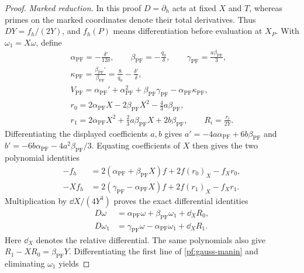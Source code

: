 \begin{proof}
\emph{Marked reduction.}
In this proof $D=\partial_h$ acts at fixed $X$ and $T$, whereas primes on
the marked coordinates denote their total derivatives.  Thus
$DY=f_h/(2Y)$, and $f_h(P)$ means differentiation before evaluation at
$X_P$.  With $\omega_1=X\omega$, define
\[
\begin{gathered}
\alpha_{\mathrm{PF}}=-\frac{\delta'}{12\delta},\qquad
\beta_{\mathrm{PF}}=-\frac{q_0}{\delta},\qquad
\gamma_{\mathrm{PF}}=\frac{a\beta_{\mathrm{PF}}}{3},\\
\kappa_{\mathrm{PF}}=\frac{\beta_{\mathrm{PF}}'}{\beta_{\mathrm{PF}}}
=\frac8{q_0}-\frac{\delta'}{\delta},\\
V_{\mathrm{PF}}=\alpha_{\mathrm{PF}}'+\alpha_{\mathrm{PF}}^2
+\beta_{\mathrm{PF}}\gamma_{\mathrm{PF}}
-\alpha_{\mathrm{PF}}\kappa_{\mathrm{PF}},\\
r_0=2\alpha_{\mathrm{PF}}X-2\beta_{\mathrm{PF}}X^2
-\tfrac43a\beta_{\mathrm{PF}},\\
r_1=2\alpha_{\mathrm{PF}}X^2+\tfrac23a\beta_{\mathrm{PF}}X
+2b\beta_{\mathrm{PF}},\qquad R_i=\frac{r_i}{2Y}.
\end{gathered}
\]
Differentiating the displayed coefficients $a,b$ gives
$a'=-4a\alpha_{\mathrm{PF}}+6b\beta_{\mathrm{PF}}$ and
$b'=-6b\alpha_{\mathrm{PF}}-4a^2\beta_{\mathrm{PF}}/3$.
Equating coefficients of $X$ then gives the two polynomial identities
\begin{equation}\label{pf:reduction-polynomials}
\begin{aligned}
-f_h&=2(\alpha_{\mathrm{PF}}+\beta_{\mathrm{PF}}X)f
       +2f(r_0)_X-f_Xr_0,\\
-Xf_h&=2(\gamma_{\mathrm{PF}}-\alpha_{\mathrm{PF}}X)f
       +2f(r_1)_X-f_Xr_1.
\end{aligned}
\end{equation}
Multiplication by $\dd X/(4Y^3)$ proves the exact differential identities
\begin{equation}\label{pf:gauss-manin}
\begin{aligned}
D\omega&=\alpha_{\mathrm{PF}}\omega
+\beta_{\mathrm{PF}}\omega_1+\dd_XR_0,\\
D\omega_1&=\gamma_{\mathrm{PF}}\omega
-\alpha_{\mathrm{PF}}\omega_1+\dd_XR_1.
\end{aligned}
\end{equation}
Here $\dd_X$ denotes the relative differential.  The same polynomials
also give $R_1-XR_0=\beta_{\mathrm{PF}}Y$.
Differentiating the first line of \eqref{pf:gauss-manin} and eliminating
$\omega_1$ yields

\end{proof}
